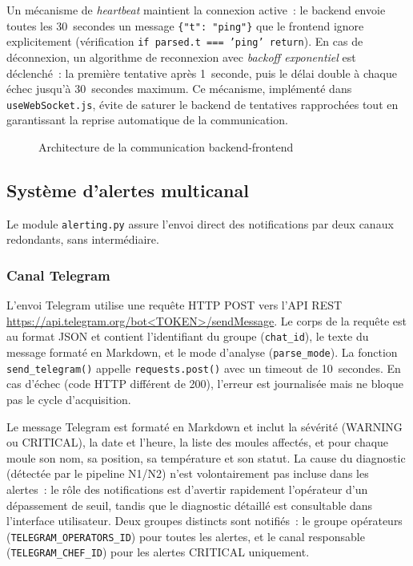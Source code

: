 \noindent Un mécanisme de \emph{heartbeat} maintient la connexion active~: le backend envoie toutes les 30~secondes un message \texttt{\{"t": "ping"\}} que le frontend ignore explicitement (vérification \texttt{if parsed.t === 'ping' return}). En cas de déconnexion, un algorithme de reconnexion avec \emph{backoff exponentiel} est déclenché~: la première tentative après 1~seconde, puis le délai double à chaque échec jusqu'à 30~secondes maximum. Ce mécanisme, implémenté dans \texttt{useWebSocket.js}, évite de saturer le backend de tentatives rapprochées tout en garantissant la reprise automatique de la communication.

\begin{figure}[htbp]
  \centering
  \caption{Architecture de la communication backend-frontend}
  \label{fig:ws_architecture}
\end{figure}

\subsection{Système d'alertes multicanal}

Le module \texttt{alerting.py} assure l'envoi direct des notifications par deux canaux redondants, sans intermédiaire.

\subsubsection{Canal Telegram}

L'envoi Telegram utilise une requête HTTP POST vers l'API REST \url{https://api.telegram.org/bot<TOKEN>/sendMessage}. Le corps de la requête est au format JSON et contient l'identifiant du groupe (\texttt{chat\_id}), le texte du message formaté en Markdown, et le mode d'analyse (\texttt{parse\_mode}). La fonction \texttt{send\_telegram()} appelle \texttt{requests.post()} avec un timeout de 10~secondes. En cas d'échec (code HTTP différent de 200), l'erreur est journalisée mais ne bloque pas le cycle d'acquisition.

Le message Telegram est formaté en Markdown et inclut la sévérité (WARNING ou CRITICAL), la date et l'heure, la liste des moules affectés, et pour chaque moule son nom, sa position, sa température et son statut. La cause du diagnostic (détectée par le pipeline N1/N2) n'est volontairement pas incluse dans les alertes~: le rôle des notifications est d'avertir rapidement l'opérateur d'un dépassement de seuil, tandis que le diagnostic détaillé est consultable dans l'interface utilisateur. Deux groupes distincts sont notifiés~: le groupe opérateurs (\texttt{TELEGRAM\_OPERATORS\_ID}) pour toutes les alertes, et le canal responsable (\texttt{TELEGRAM\_CHEF\_ID}) pour les alertes CRITICAL uniquement.

